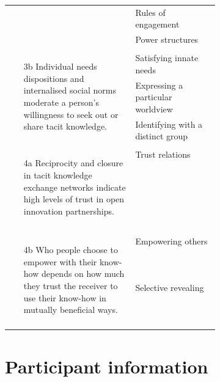 \begin{table}[]
{\begin{tabular}{l p{0.4\linewidth}}
{\begin{minipage}{0.7\linewidth}
\begin{enumerate}
\end{enumerate}
\end{minipage}} & Rules of engagement \\
& Power structures \\ \\
\multirow{3}{*}{\begin{minipage}{0.7\linewidth}
\begin{enumerate}
    \item[3b] Individual needs dispositions and internalised social norms moderate a person's willingness to seek out or share tacit knowledge.
\end{enumerate}
\end{minipage}} & Satisfying innate needs \\
& Expressing a particular worldview \\
& Identifying with a distinct group \\ \\
\multirow{1}{*}{\begin{minipage}{0.7\linewidth}
\begin{enumerate}
    \item[4a] Reciprocity and closure in tacit knowledge exchange networks indicate high levels of trust in open innovation partnerships.
\end{enumerate}
\end{minipage}} & Trust relations \\ \\  \\
 \multirow{2}{*}{\begin{minipage}{0.7\linewidth}
 \begin{enumerate}
    \item[4b] Who people choose to empower with their know-how depends on how much they trust the receiver to use their know-how in mutually beneficial ways.
\end{enumerate} 
 \end{minipage}}
& Empowering others \\
& Selective revealing \\  \\ \bottomrule
\end{tabular}
}
\end{table}

\section{Participant information}

